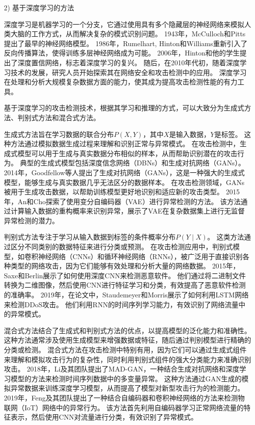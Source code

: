 2) 基于深度学习的方法\par
深度学习是机器学习的一个分支，它通过使用具有多个隐藏层的神经网络来模拟人类大脑的工作方式，从而解决复杂的模式识别问题。
1943年，McCulloch和Pitts提出了最早的神经网络模型。
1986年，Rumelhart, Hinton和Williams重新引入了反向传播算法，使得训练多层神经网络成为可能。
2006年，Hinton和他的学生提出了深度置信网络，标志着深度学习的复兴。
随后，在2010年代初，随着深度学习技术的发展，研究人员开始探索其在网络安全和攻击检测中的应用。
深度学习在处理和分析大规模复杂数据方面的能力，使其成为提高攻击检测性能的有力工具。

基于深度学习的攻击检测技术，根据其学习和推理的方式，可以大致分为生成式方法、判别式方法和混合式方法。


生成式方法旨在学习数据的联合分布$P(X,Y)$，其中$X$是输入数据，$Y$是标签。
这种方法通过模拟数据生成过程来理解和识别正常与异常模式。
在攻击检测中，生成式模型可以用于生成与真实数据分布相似的样本，从而帮助识别潜在的攻击行为。
典型的生成式模型包括深度信念网络（DBNs）和生成对抗网络（GANs）。
2014年，Goodfellow等人提出了生成对抗网络（GANs）\cite{goodfellow2014generative}，这是一种强大的生成式模型，能够生成与真实数据几乎无法区分的数据样本。
在攻击检测领域，GANs被用于生成攻击数据，以帮助训练模型更好地识别和适应新的攻击类型。
2015年，An和Cho探索了使用变分自编码器（VAE）进行异常检测的方法\cite{an2015variational}。
该方法通过计算输入数据的重构概率来识别异常，展示了VAE在复杂数据集上进行无监督异常检测的潜力。


判别式方法专注于学习从输入数据到标签的条件概率分布$P(Y∣X)$。
这类方法通过区分不同类别的数据特征来进行分类或预测。
在攻击检测应用中，判别式模型，如卷积神经网络（CNNs）和循环神经网络（RNNs），被广泛用于直接识别各种类型的网络攻击，因为它们能够有效处理和分析大量的网络数据。
2015年，Saxe和Berlin展示了如何使用深度CNN来检测恶意软件\cite{saxe2015deep}。
他们通过将二进制文件转换为二维图像，然后使用CNN进行特征学习和分类，有效提高了恶意软件检测的准确率。
2019年，在论文中，Staudemeyer和Morris展示了如何利用LSTM网络来检测DDoS攻击。
他们利用RNN的时间序列学习能力，有效识别了网络流量中的异常模式。

混合式方法结合了生成式和判别式方法的优点，以提高模型的泛化能力和准确性。
这种方法通常涉及使用生成模型来增强数据或特征，随后通过判别模型进行精确的分类或检测。
混合式方法在攻击检测中特别有用，因为它们可以通过生成式组件来理解和模拟攻击行为的复杂性，同时利用判别式组件的强大分类能力来准确识别攻击。
2018年，Li及其团队提出了MAD-GAN\cite{li2018mad}，一种结合生成对抗网络和深度学习模型的方法来检测时间序列数据中的多变量异常。
这种方法通过GAN生成的模拟异常数据来训练深度学习模型，从而提高了模型对新型攻击行为的检测能力。
2019年，Feng及其团队提出了一种结合自编码器和卷积神经网络的方法来检测物联网（IoT）网络中的异常行为\cite{feng2019deep}。
该方法首先利用自编码器学习正常网络流量的特征表示，然后使用CNN对流量进行分类，有效识别了异常模式。


